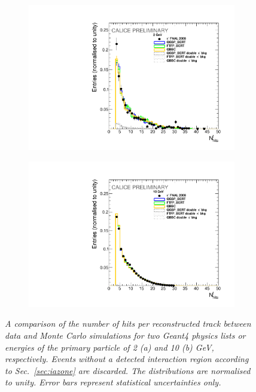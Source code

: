\begin{figure}
	\centering
	\begin{subfigure}{0.5\textwidth}
		\centering
		\includegraphics[width=.90\linewidth]{ECAL/plots/number-2.pdf}
		\caption{\label{fig:trh2} }
	\end{subfigure}%
	\begin{subfigure}{0.5\textwidth}
		\centering
		\includegraphics[width=.90\linewidth]{ECAL/plots/number-10.pdf}
		\caption{\label{fig:trh10} }
	\end{subfigure}
	\caption{\label{fig:trackhitsexample} \sl A comparison of the number of hits per reconstructed track between data and Monte Carlo simulations for two {\sc Geant}4 physics lists  or energies of the primary particle of 2 (a) and 10 (b) GeV, respectively. Events without a detected interaction region according to Sec.~\ref{sec:iazone} are discarded. The distributions are normalised to unity. Error bars represent statistical uncertainties only.}
\end{figure}

